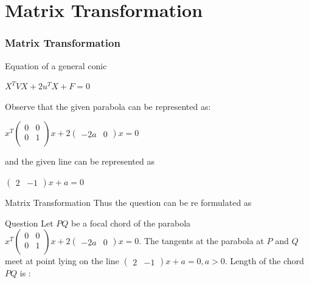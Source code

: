 \documentclass[12pt]{beamer}
\begin{document}
\section{Matrix Transformation}
\begin{frame}
  \frametitle{Matrix Transformation}

  \begin{block}{Equation of a general conic}
    \begin{center}
        $X^TVX + 2u^TX + F = 0$
    \end{center}
  \end{block}
    \begin{block}{Observe that the given parabola can be represented as:}
    \begin{center}
       $ x^T \left( {\begin{array}{cc} 0 & 0 \\ 0 & 1 \\ \end{array}} \right) x + 2 \left({\begin{array}{cc}-2a &  0\end{array}}\right)x = 0$
    \end{center}

    \end{block}  
    \begin{block}{and the given line can be represented as}
    \begin{center}$\left( \begin{array}{cc} 2 &-1\end{array}\right)x + a = 0$\end{center}
    \end{block}  
    \end{frame}
    \begin{frame}{Matrix Transformation}
        Thus the question can be re formulated as
        \begin{block}{Question}
        Let $PQ$ be a focal chord of the parabola $ x^T \left( {\begin{array}{cc} 0 & 0 \\ 0 & 1 \\ \end{array}} \right) x + 2 \left({\begin{array}{cc}-2a &  0\end{array}}\right)x = 0$. The tangents at the parabola at $P$ and $Q$ meet at point lying on the line $\left( \begin{array}{cc} 2 &-1\end{array}\right)x + a = 0, a>0$. Length of the chord $PQ$ is : 
        \end{block}
    \end{frame}
\end{document}
